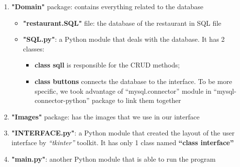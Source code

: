 \begin{enumerate}
  \item \textbf{"Domain"} package: contains everything related to the database
    \begin{itemize}
        \item \textbf{"restaurant.SQL"} file: the database of the restaurant in SQL file
        \item \textbf{"SQL.py"}: a Python module that deals with the database. It has 2 classes: 
            \begin{itemize}
                \item \textbf{class sqll} is responsible for the CRUD methods;
                \item \textbf{class buttons} connects the database to the interface. To be more specific, we took advantage of “mysql.connector” module in “mysql-connector-python” package to link them together 
            \end{itemize}
    \end{itemize}
  \item \textbf{"Images"} package: has the images that we use in our interface
  \item \textbf{"INTERFACE.py"}: a Python module that created the layout of the user interface by \textit{“tkinter”} toolkit. It has only 1 class named \textbf{“class interface”}
  \item \textbf{"main.py"}: another Python module that is able to run the program
\end{enumerate}
